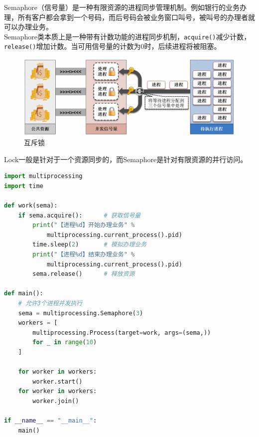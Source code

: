 Semaphore（信号量）是一种有限资源的进程同步管理机制。例如银行的业务办理，所有客户都会拿到一个号码，而后号码会被业务窗口叫号，被叫号的办理者就可以办理业务。 \\

Semaphore类本质上是一种带有计数功能的进程同步机制，\lstinline|acquire()|减少计数，\lstinline|release()|增加计数。当可用信号量的计数为0时，后续进程将被阻塞。

\begin{figure}[H]
	\centering
	\includegraphics[scale=0.6]{img/C2/2-7/1.png}
	\caption{互斥锁}
\end{figure}

Lock一般是针对于一个资源同步的，而Semaphore是针对有限资源的并行访问。

\begin{lstlisting}[language=Python, title=信号量同步处理]
import multiprocessing
import time

def work(sema):
	if sema.acquire():      # 获取信号量
		print("【进程%d】开始办理业务" % 
			multiprocessing.current_process().pid)
		time.sleep(2)       # 模拟办理业务
		print("【进程%d】结束办理业务" % 
			multiprocessing.current_process().pid)
		sema.release()      # 释放资源

def main():
	# 允许3个进程并发执行
	sema = multiprocessing.Semaphore(3)
	workers = [
		multiprocessing.Process(target=work, args=(sema,))
		for _ in range(10)
	]

	for worker in workers:
		worker.start()
	for worker in workers:
		worker.join()

if __name__ == "__main__":
	main()
\end{lstlisting}

